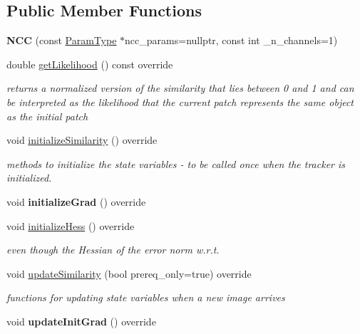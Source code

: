 \subsection*{Public Member Functions}
\begin{DoxyCompactItemize}
\item 
\hypertarget{classNCC_a90696353e8f49c308ba9849bca58df9e}{{\bfseries N\-C\-C} (const \hyperlink{structNCCParams}{Param\-Type} $\ast$ncc\-\_\-params=nullptr, const int \-\_\-n\-\_\-channels=1)}\label{classNCC_a90696353e8f49c308ba9849bca58df9e}

\item 
\hypertarget{classNCC_a450dee83150418ef62bc3c4a0734d1c7}{double \hyperlink{classNCC_a450dee83150418ef62bc3c4a0734d1c7}{get\-Likelihood} () const override}\label{classNCC_a450dee83150418ef62bc3c4a0734d1c7}

\begin{DoxyCompactList}\small\item\em returns a normalized version of the similarity that lies between 0 and 1 and can be interpreted as the likelihood that the current patch represents the same object as the initial patch \end{DoxyCompactList}\item 
void \hyperlink{classNCC_ad0565805b28b14370a92661496dfe572}{initialize\-Similarity} () override
\begin{DoxyCompactList}\small\item\em methods to initialize the state variables -\/ to be called once when the tracker is initialized. \end{DoxyCompactList}\item 
\hypertarget{classNCC_a111d08c4e16cae3fe4f5c3965c9e7b9f}{void {\bfseries initialize\-Grad} () override}\label{classNCC_a111d08c4e16cae3fe4f5c3965c9e7b9f}

\item 
void \hyperlink{classNCC_af3ef7c448e4beac28090dc0d801c9660}{initialize\-Hess} () override
\begin{DoxyCompactList}\small\item\em even though the Hessian of the error norm w.\-r.\-t. \end{DoxyCompactList}\item 
void \hyperlink{classNCC_ad230e363657b023a80984543788a42e0}{update\-Similarity} (bool prereq\-\_\-only=true) override
\begin{DoxyCompactList}\small\item\em functions for updating state variables when a new image arrives \end{DoxyCompactList}\item 
\hypertarget{classNCC_abafc6acb39cab570310acd0b493d3f57}{void {\bfseries update\-Init\-Grad} () override}\label{classNCC_abafc6acb39cab570310acd0b493d3f57}


\end{DoxyCompactItemize}
